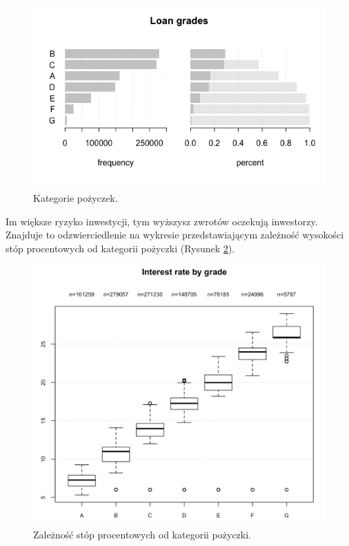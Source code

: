 \begin{figure}[h] \centering %
	\includegraphics[scale=0.7]{img/grades.png}
	\caption{Kategorie pożyczek.}
	\label{lc:grades}
\end{figure}

Im większe ryzyko inwestycji, tym wyższysz zwrotów oczekują inwestorzy. Znajduje to odzwierciedlenie na wykresie przedstawiającym zależność wysokości stóp procentowych od kategorii pożyczki (Rysunek \ref{lc:int2grade}).

\begin{figure}[h] \centering %
	\includegraphics[scale=0.5]{img/int2grade.png}
	\caption{Zależność stóp procentowych od kategorii pożyczki.}
	\label{lc:int2grade}
\end{figure}


